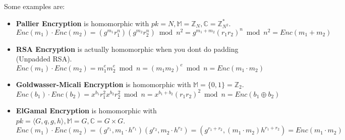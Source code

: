 \documentclass[12pt,reqno]{amsart}
\begin{document}
Some examples are:
\begin{itemize}
	\item \textbf{Pallier Encryption} is homomorphic with $pk=N, \mathbb{M}=\mathbb{Z}_N, \mathbb{C}=\mathbb{Z}^*_{N^2}$.
	$$
	Enc(m_1)\cdot Enc(m_2) = (g^{m_1} r_1^n)(g^{m_2} r_2^n) \bmod n^2 = g^{m_1+m_2}(r_1r_2)^n \bmod n^2 = Enc(m_1 + m_2)
	$$
	\item \textbf{RSA Encryption} is actually homomorphic when you dont do padding (Unpadded RSA).
	$$
	Enc(m_1)\cdot Enc(m_2) = m_1^e m_2^e \bmod n = (m_1 m_2)^e \bmod n = Enc(m_1 \cdot m_2)
	$$
	\item \textbf{Goldwasser-Micali Encryption} is homomorphic with $\mathbb{M}=\{0, 1\}=\mathbb{Z}_2$.
	$$
	Enc(b_1)\cdot Enc(b_2) = x^{b_1}r_1^2 x^{b_2} r_2^2 \bmod n = x^{b_1 + b_2} (r_1r_2)^2 \bmod n = Enc(b_1 \oplus b_2)
	$$
	\item \textbf{ElGamal Encryption} is homomorphic with $pk=\langle G, q, g, h\rangle, \mathbb{M}=G, \mathbb{C}=G\times G$.
	$$
	Enc(m_1)\cdot Enc(m_2) = (g^{r_1}, m_1 \cdot h^{r_1})(g^{r_2}, m_2 \cdot h^{r_2}) = (g^{r_1+r_2}, (m_1 \cdot m_2) h^{r_1 + r_2}) = Enc(m_1 \cdot m_2)
	$$
\end{itemize}
\end{document}

